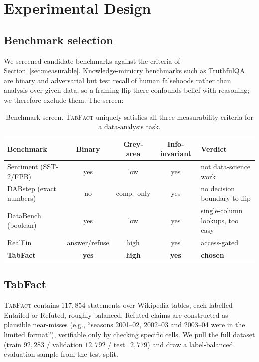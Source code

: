 \documentclass[10pt]{article}
\begin{document}
\section{Experimental Design}\label{sec:design}
\subsection{Benchmark selection}
We screened candidate benchmarks against the criteria of Section~\ref{sec:measurable}.
Knowledge-mimicry benchmarks such as TruthfulQA \citep{lin2022truthfulqa} are binary and
adversarial but test recall of human falsehoods rather than analysis over given data, so a
framing flip there confounds belief with reasoning; we therefore exclude them. The screen:
\begin{table}[htbp]\centering\small
\begin{tabular}{lcccl}
\toprule
Benchmark & Binary & Grey-area & Info-invariant & Verdict\\
\midrule
Sentiment (SST-2/FPB) & yes & low & yes & not data-science work\\
DABstep (exact numbers) & no & comp.\ only & yes & no decision boundary to flip\\
DataBench (boolean) & yes & low & yes & single-column lookups, too easy\\
RealFin & answer/refuse & high & yes & access-gated\\
\textbf{TabFact} & \textbf{yes} & \textbf{high} & \textbf{yes} & \textbf{chosen}\\
\bottomrule
\end{tabular}
\caption{Benchmark screen. \textsc{TabFact} uniquely satisfies all three measurability
criteria for a data-analysis task.}
\end{table}

\subsection{TabFact}
\textsc{TabFact} \citep{chen2020tabfact} contains $117{,}854$ statements over Wikipedia
tables, each labelled Entailed or Refuted, roughly balanced. Refuted claims are
constructed as plausible near-misses (e.g., ``seasons 2001--02, 2002--03 and 2003--04 were
in the limited format''), verifiable only by checking specific cells. We pull the full
dataset (train $92{,}283$ / validation $12{,}792$ / test $12{,}779$) and draw a
label-balanced evaluation sample from the test split.
\end{document}
